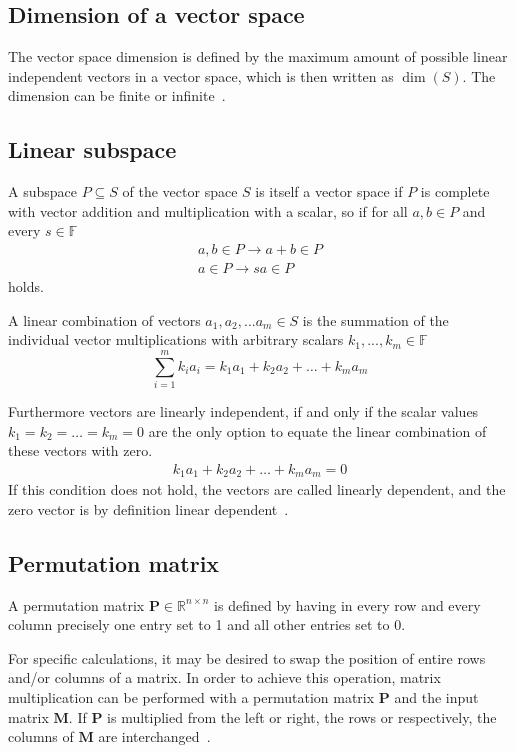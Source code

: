 \documentclass[11pt,
  oneside,openany,    %
]{scrreprt}
\begin{document}
\subsection{Dimension of a vector space}
The vector space dimension is defined by the maximum amount of possible linear independent vectors in a vector space, which is then written as $\operatorname{dim}(S)$. The dimension can be finite or infinite~\cite{mathefuerInfoBand1}.

\subsection{Linear subspace}
A subspace $P \subseteq S$ of the vector space $S$ is itself a vector space if $P$ is complete with vector addition and multiplication with a scalar, so if for all $a, b \in P$ and every $s \in \mathbb{F}$  
\begin{gather*}
a, b \in P \rightarrow a + b \in P\\
a \in P \rightarrow s a \in P
\end{gather*}
holds.


A linear combination of vectors $a_1, a_2, ... a_m \in S$ is the summation of the individual vector multiplications with arbitrary scalars $k_1, ... , k_m \in \mathbb{F}$
\begin{equation*}
    \sum_{i=1}^{m} k_i a_i = k_1 a_1 + k_2 a_2 + \dots + k_m a_m
\end{equation*}

Furthermore vectors are linearly independent, if and only if the scalar values $k_1 = k_2 = \dots = k_m = 0$ are the only option to equate the linear combination of these vectors with zero.
\begin{gather}
    k_1 a_1 + k_2 a_2 + \dots + k_m a_m = 0
\end{gather}
If this condition does not hold, the vectors are called linearly dependent, and the zero vector is by definition linear dependent~\cite{mathefuerInfoBand1}.

\subsection{Permutation matrix}
A permutation matrix $\boldsymbol{P} \in \mathds{R}^{n \times n}$ is defined by having in every row and every column precisely one entry set to 1 and all other entries set to 0.

For specific calculations, it may be desired to swap the position of entire rows and/or columns of a matrix. In order to achieve this operation, matrix multiplication can be performed with a permutation matrix $\boldsymbol{P}$ and the input matrix $\boldsymbol{M}$. If $\boldsymbol{P}$ is multiplied from the left or right, the rows or respectively, the columns of $\boldsymbol{M}$ are interchanged~\cite{liesenlineareAlgebra}.
\end{document}
